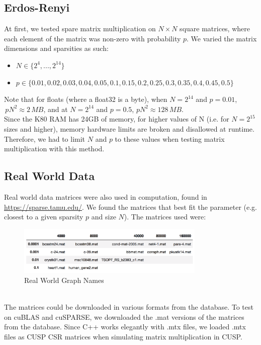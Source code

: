 \documentclass[12pt]{article}
\begin{document}
\subsection{Erdos-Renyi}
\hspace{0.5cm}At first, we tested spare matrix multiplication on $N \times N$ square matrices, where each element of the matrix was non-zero with probability $p$. We varied the matrix dimensions and sparsities as such: 
\begin{itemize} \item $N \in \{2^{4},...,2^{14} \}$ \item $p \in \{0.01, 0.02, 0.03, 0.04, 0.05, 0.1, 0.15, 0.2, 0.25, 0.3, 0.35, 0.4, 0.45, 0.5\}$
\end{itemize}
\hspace{0.5cm}Note that for floats (where a float32 is a byte), when $N = 2^{14}$ and $p = 0.01$, $\, pN^{2} \approx 2 \, MB$, and at $N = 2^{14}$ and $p = 0.5$, $pN^{2} \approx 128 \, MB$.\\
\hspace{0.5cm}Since the K80 RAM has 24GB of memory, for higher values of N (i.e. for $N = 2^{15}$ sizes and higher), memory hardware limits are broken and disallowed at runtime. Therefore, we had to limit $N$ and $p$ to these values when testing matrix multiplication with this method.  



\subsection{Real World Data}
\hspace{0.5cm}Real world data matrices were also used in computation, found in \url{https://sparse.tamu.edu/}. We found the matrices that best fit the parameter (e.g. closest to a given sparsity $p$ and size $N$). The matrices used were:
\begin{figure}[h]
  \caption{Real World Graph Names}
  \centering 
  \includegraphics[width = 0.8\textwidth]{matrix_names.png}
\end{figure}\\
\hspace{0.5cm}The matrices could be downloaded in various formats from the database. To test on cuBLAS and cuSPARSE, we downloaded the .mat versions of the matrices from the database. Since C++ works elegantly with .mtx files, we loaded .mtx files as CUSP CSR matrices when simulating matrix multiplication in CUSP.
\end{document}
